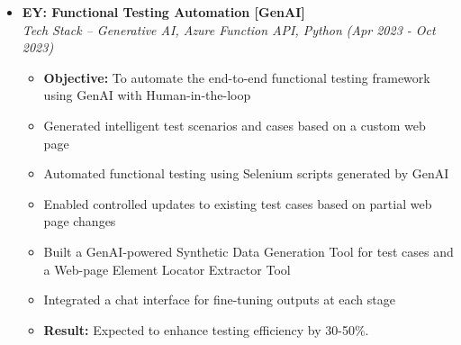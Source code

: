 \documentclass[a4paper,10pt]{article}
\newcommand{\isep}{-2 pt}
\begin{document}
\begin{itemize}
\item \textbf{EY: Functional Testing Automation [GenAI]}  \\
    \emph{Tech Stack -- Generative AI, Azure Function API, Python} \hfill {\emph{(Apr 2023 - Oct 2023)}}
    \\[-0.6cm]
    \begin{itemize}\itemsep \isep
    \item \textbf{Objective:} To automate the end-to-end functional testing framework using GenAI with Human-in-the-loop
    \item Generated intelligent test scenarios and cases based on a custom web page
    \item Automated functional testing using Selenium scripts generated by GenAI
    \item Enabled controlled updates to existing test cases based on partial web page changes
    \item Built a GenAI-powered Synthetic Data Generation Tool for test cases and a Web-page Element Locator Extractor Tool
    \item Integrated a chat interface for fine-tuning outputs at each stage
    \item \textbf{Result:} Expected to enhance testing efficiency by 30-50\%. 
        \\ [-0.5cm]
    \end{itemize}


\end{itemize}
\end{document}

